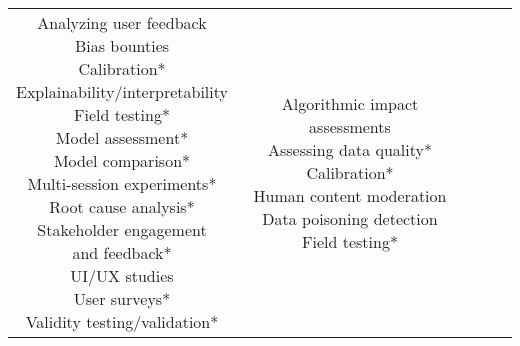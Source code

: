 \documentclass[fleqn]{article}
\begin{document}
\begin{landscape}
\begin{table}[H]
\begin{tabular}{|c|c|c|c|c|}
{			\textbullet\hspace{3pt} Analyzing user feedback \\ 
			\textbullet\hspace{3pt} Bias bounties \\ 
			\textbullet\hspace{3pt} Calibration*\\ 
			\textbullet\hspace{3pt} Explainability/interpretability \\ 
			\textbullet\hspace{3pt} Field testing*\\ 
			\textbullet\hspace{3pt} Model assessment*\\ 
			\textbullet\hspace{3pt} Model comparison*\\ 
			\textbullet\hspace{3pt} Multi-session experiments*\\ 
			\textbullet\hspace{3pt} Root cause analysis*\\ 
			\textbullet\hspace{3pt} Stakeholder engagement\\\hspace{10pt}and feedback*\\ 
			\textbullet\hspace{3pt} UI/UX studies \\ 
			\textbullet\hspace{3pt} User surveys*\\ 
			\textbullet\hspace{3pt} Validity testing/validation*\\ 
		}
		& \makecell[l]{
			\textbullet\hspace{3pt} Algorithmic impact assessments \\ 
			\textbullet\hspace{3pt} Assessing data quality*\\ 
			\textbullet\hspace{3pt} Calibration*\\ 
			\textbullet\hspace{3pt} Human content moderation\\  
			\textbullet\hspace{3pt} Data poisoning detection \\ 
			\textbullet\hspace{3pt} Field testing*\\ 
}
\end{tabular}
\end{table}
\end{landscape}
\end{document}
